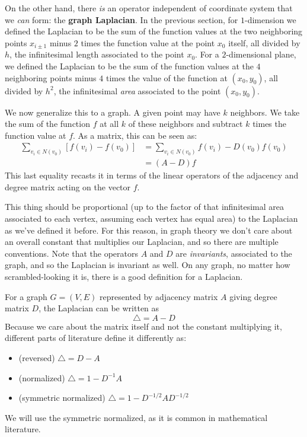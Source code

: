 	On the other hand, there \emph{is} an operator independent of coordinate system that we \emph{can} form: the \textbf{graph Laplacian}. In the previous section, for $1$-dimension we defined the Laplacian to be the sum of the function values at the two neighboring points $x_{i\pm 1}$ minus $2$ times the function value at the point $x_0$ itself, all divided by $h$, the infinitesimal length associated to the point $x_0$. For a $2$-dimensional plane, we defined the Laplacian to be the sum of the function values at the $4$ neighboring points minus $4$ times the value of the function at $(x_0, y_0)$, all divided by $h^2$, the infinitesimal \emph{area} associated to the point $(x_0, y_0)$.
	
	We now generalize this to a graph. A given point may have $k$ neighbors. We take the sum of the function $f$ at all $k$ of these neighbors and subtract $k$ times the function value at $f$. As a matrix, this can be seen as:
	\begin{align}
		\sum_{v_i \in N(v_0)} [f(v_{i}) -  f(v_0)] &= \sum_{v_i \in N(v_0)} f(v_{i}) - D(v_0) f(v_0)\\ &= (A-D) f
	\end{align} 
	This last equality recasts it in terms of the linear operators of the adjacency and degree matrix acting on the vector $f$. 
	
	This thing should be proportional (up to the factor of that infinitesimal area associated to each vertex, assuming each vertex has equal area) to the Laplacian as we've defined it before. For this reason, in graph theory we don't care about an overall constant that multiplies our Laplacian, and so there are multiple conventions. Note that the operators $A$ and $D$ are \emph{invariants}, associated to the graph, and so the Laplacian is invariant as well. On any graph, no matter how scrambled-looking it is, there is a good definition for a Laplacian. 
	\begin{defn}
		For a graph $G = (V,E)$ represented by adjacency matrix $A$ giving degree matrix $D$, the Laplacian can be written as 
		\begin{equation}
			\triangle = A - D
		\end{equation}
		Because we care about the matrix itself and not the constant multiplying it, different parts of literature define it differently as:
		\begin{itemize}
			\item (reversed) $\triangle = D-A$
			\item (normalized) $\triangle = 1 - D^{-1} A$
			\item (symmetric normalized) $\triangle = 1 - D^{-1/2} A D^{-1/2}$ 
		\end{itemize}
	\end{defn}
	We will use the symmetric normalized, as it is common in mathematical literature. 
	
